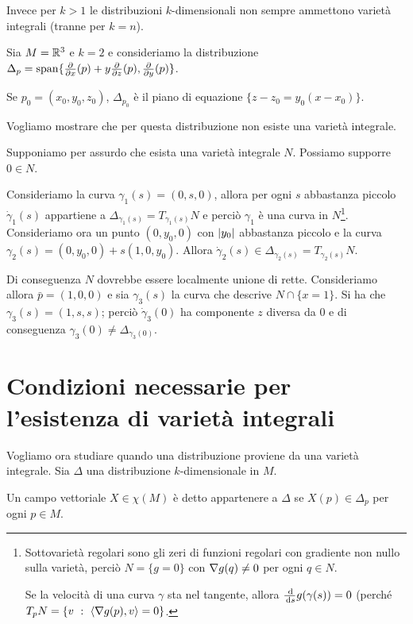 Invece per $k>1$ le distribuzioni $k$-dimensionali non sempre ammettono varietà integrali (tranne per $k=n$).

\begin{example}
	Sia $M=\mathbb R^3$ e $k=2$ e consideriamo la distribuzione $\Delta_p=\mathrm{span}\{\frac{\partial }{\partial x}(p)+y\frac{\partial }{\partial z}(p),\frac{\partial }{\partial y}(p)\}$.
	
	Se $p_0=(x_0,y_0,z_0)$, $\Delta_{p_0}$ è il piano di equazione $\{z-z_0=y_0(x-x_0)\}$.
	
	Vogliamo mostrare che per questa distribuzione non esiste una varietà integrale.
	
	Supponiamo per assurdo che esista una varietà integrale $N$. Possiamo supporre $0\in N$.
	
	Consideriamo la curva $\gamma_1(s)=(0,s,0)$, allora per ogni $s$ abbastanza piccolo $\dot\gamma_1(s)$ appartiene a $\Delta_{\gamma_1(s)}=T_{\gamma_1(s)}N$ e perciò $\gamma_1$ è una curva in $N$\footnote{Sottovarietà regolari sono gli zeri di funzioni regolari con gradiente non nullo sulla varietà, perciò $N=\{g=0\}$ con $\nabla g(q)\ne 0$ per ogni $q\in N$.
	
	Se la velocità di una curva $\gamma$ sta nel tangente, allora $\frac{\,\mathrm d}{\,\mathrm d s}g(\gamma(s))=0$ (perché $T_pN=\{v\ : \ \langle\nabla g(p),v\rangle =0\}$.}.
	Consideriamo ora un punto $(0,y_0,0)$ con $\lvert y_0\rvert$ abbastanza piccolo e la curva $\gamma_2(s)=(0,y_0,0)+s(1,0,y_0)$. Allora $\dot\gamma_2(s)\in\Delta_{\gamma_2(s)}=T_{\gamma_2(s)}N$.
	
	Di conseguenza $N$ dovrebbe essere localmente unione di rette. Consideriamo allora $\bar p=(1,0,0)$ e sia $\gamma_3(s)$ la curva che descrive $N\cap\{x=1\}$.
	Si ha che $\gamma_3(s)=(1,s,s)$; perciò $\dot\gamma_3(0)$ ha componente $z$ diversa da 0 e di conseguenza $\gamma_3(0)\ne \Delta_{\gamma_3(0)}$.
\end{example}

\section{Condizioni necessarie per l'esistenza di varietà integrali}

Vogliamo ora studiare quando una distribuzione proviene da una varietà integrale.
Sia $\Delta$ una distribuzione $k$-dimensionale in $M$.

\begin{definition}
	Un campo vettoriale $X\in\chi(M)$ è detto appartenere a $\Delta$ se $X(p)\in\Delta_p$ per ogni $p\in M$.
\end{definition}

